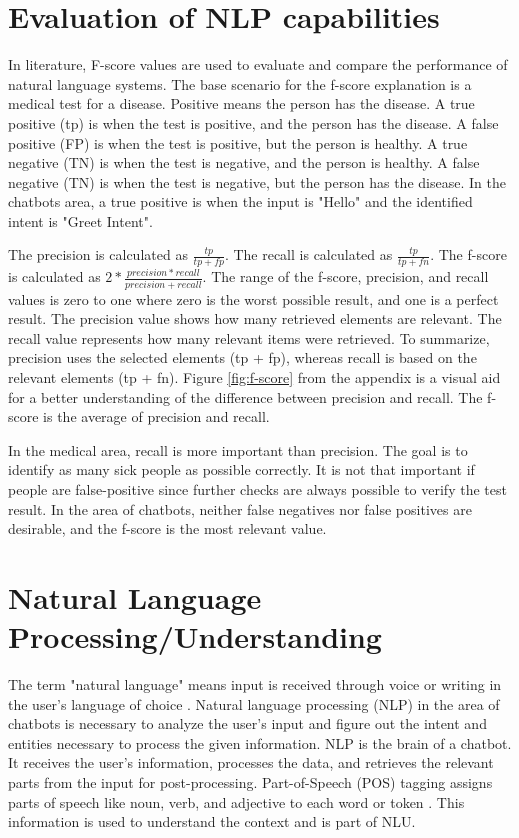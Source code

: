 \section{Evaluation of NLP capabilities}
In literature, F-score values are used to evaluate and compare the performance of natural language systems.
The base scenario for the f-score explanation is a medical test for a disease.
Positive means the person has the disease.
A true positive (tp) is when the test is positive, and the person has the disease.
A false positive (FP) is when the test is positive, but the person is healthy.
A true negative (TN) is when the test is negative, and the person is healthy.
A false negative (TN) is when the test is negative, but the person has the disease.
In the chatbots area, a true positive is when the input is "Hello" and the identified intent is "Greet Intent".

The precision is calculated as $\frac{tp}{tp + fp}$.
The recall is calculated as $\frac{tp}{tp + fn}$.
The f-score is calculated as $2 * \frac{precision * recall}{precision + recall}$.
The range of the f-score, precision, and recall values is zero to one where zero is the worst possible result, and one is a perfect result.
The precision value shows how many retrieved elements are relevant.
The recall value represents how many relevant items were retrieved.
To summarize, precision uses the selected elements (tp + fp), whereas recall is based on the relevant elements (tp + fn).
Figure \ref{fig:f-score} from the appendix is a visual aid for a better understanding of the difference between precision and recall.
The f-score is the average of precision and recall.

In the medical area, recall is more important than precision.
The goal is to identify as many sick people as possible correctly.
It is not that important if people are false-positive since further checks are always possible to verify the test result.
In the area of chatbots, neither false negatives nor false positives are desirable, and the f-score is the most relevant value.

\section{Natural Language Processing/Understanding}   
The term "natural language" means input is received through voice or writing in the user's language of choice \cite{buiildChatbotsPython}.
Natural language processing (NLP) in the area of chatbots is necessary to analyze the user's input and figure out the intent and entities necessary to process the given information. 
NLP is the brain of a chatbot.
It receives the user's information, processes the data, and retrieves the relevant parts from the input for post-processing.
Part-of-Speech (POS) tagging assigns parts of speech like noun, verb, and adjective to each word or token \cite{buiildChatbotsPython}.
This information is used to understand the context and is part of NLU.

